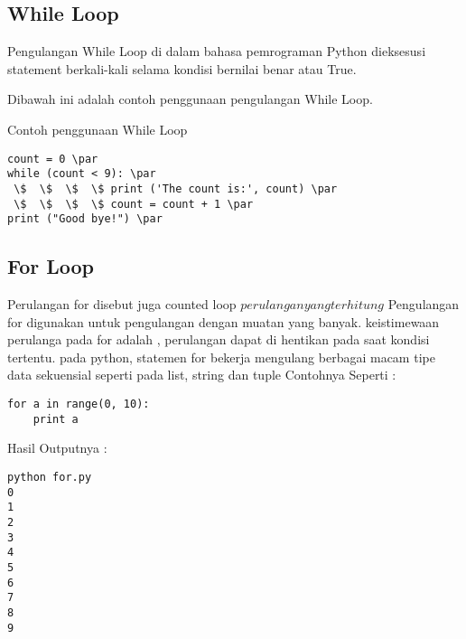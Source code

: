 \subsection{While Loop}
Pengulangan While Loop di dalam bahasa pemrograman Python dieksesusi statement berkali-kali selama kondisi bernilai benar atau True. \par
\vspace{\baselineskip}
\vspace{\baselineskip}
Dibawah ini adalah contoh penggunaan pengulangan While Loop. \par
\vspace{\baselineskip}
\vspace{12pt}
Contoh penggunaan While Loop \par
\vspace{\baselineskip}
\vspace{\baselineskip}
\begin{verbatim}
count = 0 \par
while (count < 9): \par
 \$  \$  \$  \$ print ('The count is:', count) \par
 \$  \$  \$  \$ count = count + 1 \par
print ("Good bye!") \par
\end{verbatim}
\vspace{\baselineskip}
\vspace{\baselineskip}
\vspace{\baselineskip}
\vspace{12pt}

\subsection{For Loop}
Perulangan for disebut juga counted loop \(perulangan yang terhitung\)
Pengulangan for digunakan untuk pengulangan dengan muatan yang banyak\cite{van2007python}.
keistimewaan perulanga pada for adalah , perulangan dapat di hentikan pada saat kondisi tertentu. pada python, statemen for bekerja mengulang berbagai macam tipe data sekuensial seperti pada list, string dan tuple
Contohnya Seperti :
\begin{verbatim}
for a in range(0, 10):
	print a
\end{verbatim}
Hasil Outputnya :
\begin{verbatim}
python for.py
0
1
2
3
4
5
6
7
8
9
\end{verbatim}


